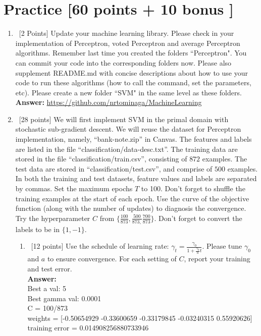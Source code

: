 \documentclass[12pt, fullpage,letterpaper]{article}
\newcommand{\Answer}{{\\\textbf{Answer: }}}
\begin{document}
\section{Practice [60 points + 10 bonus ]}
\begin{enumerate}
	\item~[2 Points] Update your machine learning library. Please check in your implementation of Perceptron, voted Perceptron and average Perceptron algorithms. Remember last time you created the folders ``Perceptron". You can commit your code into the corresponding folders now. Please also supplement README.md with concise descriptions about how to use your code to run these algorithms (how to call the command, set the parameters, etc). Please create a new folder ``SVM" in the same level as these folders.  
	\Answer \url{https://github.com/nrtominaga/MachineLearning}
	\item~[28 points] We will first implement SVM in the primal domain with stochastic sub-gradient descent. We will reuse the  dataset for Perceptron implementation, namely, ``bank-note.zip'' in Canvas. The features and labels are listed in the file ``classification/data-desc.txt''. The training data are stored in the file ``classification/train.csv'', consisting of $872$ examples. The test data are stored in ``classification/test.csv'', and comprise of $500$ examples. In both the training and test datasets, feature values and labels are separated by commas. Set the maximum epochs $T$ to 100. Don't forget to shuffle the training examples at the start of each epoch. Use the curve of the objective function (along with the number of updates) to diagnosis the convergence. Try the hyperparameter $C$ from $\{ \frac{100}{873}, \frac{500}{873,} \frac{700}{873}\}$. Don't forget to convert the labels to be in $\{1, -1\}$.  
	\begin{enumerate}
		\item~[12 points] Use the schedule of learning rate: $\gamma_t = \frac{\gamma_0}{1+\frac{\gamma_0}{a}t}	$. Please tune $\gamma_0$ and $a$ to ensure convergence. For each setting of $C$, report your training and test error. 
		\Answer\\
		Best a val:  5 \\
		Best gamma val:  0.0001 \\
		C =  100/873 \\
		weights =  [-0.50654929 -0.33600659 -0.33179845 -0.03240315  0.55920626] \\
		training error =  0.014908256880733946 \\

\end{enumerate}
\end{enumerate}
\end{document}

